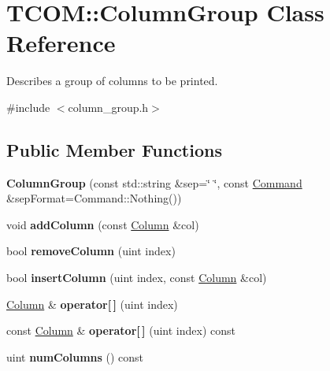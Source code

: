 \hypertarget{class_t_c_o_m_1_1_column_group}{\section{T\-C\-O\-M\-:\-:Column\-Group Class Reference}
\label{class_t_c_o_m_1_1_column_group}
}


Describes a group of columns to be printed.  




{\ttfamily \#include $<$column\-\_\-group.\-h$>$}

\subsection*{Public Member Functions}
\begin{DoxyCompactItemize}
\item 
\hypertarget{class_t_c_o_m_1_1_column_group_aa1b6a9cb576a25f7a5d776fa1dc79f89}{{\bfseries Column\-Group} (const std\-::string \&sep=\char`\"{} \char`\"{}, const \hyperlink{class_t_c_o_m_1_1_command}{Command} \&sep\-Format=Command\-::\-Nothing())}\label{class_t_c_o_m_1_1_column_group_aa1b6a9cb576a25f7a5d776fa1dc79f89}

\item 
\hypertarget{class_t_c_o_m_1_1_column_group_a9e8d96e8346eb1ec88606739827778f6}{void {\bfseries add\-Column} (const \hyperlink{class_t_c_o_m_1_1_column}{Column} \&col)}\label{class_t_c_o_m_1_1_column_group_a9e8d96e8346eb1ec88606739827778f6}

\item 
\hypertarget{class_t_c_o_m_1_1_column_group_a4c511d0391aaea636c3ee2d888f8bf0d}{bool {\bfseries remove\-Column} (uint index)}\label{class_t_c_o_m_1_1_column_group_a4c511d0391aaea636c3ee2d888f8bf0d}

\item 
\hypertarget{class_t_c_o_m_1_1_column_group_a2a4ca0e9da17cfb9abaf9bf41ee17baf}{bool {\bfseries insert\-Column} (uint index, const \hyperlink{class_t_c_o_m_1_1_column}{Column} \&col)}\label{class_t_c_o_m_1_1_column_group_a2a4ca0e9da17cfb9abaf9bf41ee17baf}

\item 
\hypertarget{class_t_c_o_m_1_1_column_group_acbe88b679746e6995e1be8567fdc18d1}{\hyperlink{class_t_c_o_m_1_1_column}{Column} \& {\bfseries operator\mbox{[}$\,$\mbox{]}} (uint index)}\label{class_t_c_o_m_1_1_column_group_acbe88b679746e6995e1be8567fdc18d1}

\item 
\hypertarget{class_t_c_o_m_1_1_column_group_a650b9da7f632a37f578167f76374070d}{const \hyperlink{class_t_c_o_m_1_1_column}{Column} \& {\bfseries operator\mbox{[}$\,$\mbox{]}} (uint index) const }\label{class_t_c_o_m_1_1_column_group_a650b9da7f632a37f578167f76374070d}

\item 
\hypertarget{class_t_c_o_m_1_1_column_group_adeb689464933d14e834529a9977394f8}{uint {\bfseries num\-Columns} () const }\label{class_t_c_o_m_1_1_column_group_adeb689464933d14e834529a9977394f8}

\end{DoxyCompactItemize}
